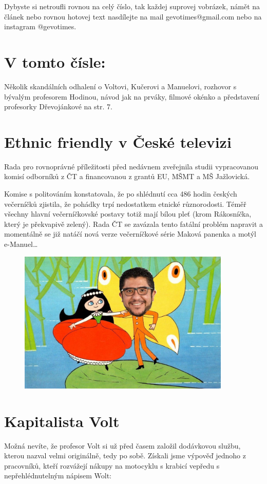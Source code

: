 \documentclass[twoside, 11pt]{article}
\begin{document}
 Dybyste si netroufli rovnou na celý číslo, tak každej suprovej vobrázek,
 námět na článek nebo rovnou hotovej text nasdílejte na mail \mbox{gevotimes@gmail.com} nebo na instagram \mbox{@gevotimes}.

\vspace{1.75\baselineskip}
\section*{V tomto čísle:}
Několik skandálních odhalení o Voltovi, Kučerovi a Manuelovi, rozhovor s bývalým profesorem Hodinou, návod jak na prváky, filmové okénko a představení profesorky Dřevojánkové na str. 7.

\clearpage
\section*{Ethnic friendly v České televizi}
Rada pro rovnoprávné příležitosti před nedávnem
zveřejnila studii vypracovanou komisí odborníků z
ČT a financovanou z grantů EU, MŠMT a MŠ
Jažlovická.


Komise s politováním konstatovala, že po shlédnutí
cca 486 hodin českých večerníčků zjistila, že
pohádky trpí nedostatkem etnické různorodosti.
Téměř všechny hlavní večerníčkovské postavy totiž
mají bílou pleť (krom Rákosníčka, který je
překvapivě zelený). Rada ČT se zavázala tento
fatální problém napravit a momentálně se již natáčí
nová verze večerníčkové série Maková panenka a
motýl e-Manuel\dots


\begin{figure}[htbp]
    \centering
    \includegraphics[width=0.9\textwidth]{emanuel}
\end{figure}

\chead{}
\clearpage
\section*{Kapitalista Volt}
Možná nevíte, že profesor Volt si už před časem založil dodávkovou službu, kterou nazval velmi
originálně, tedy po sobě. Získali jsme výpověď jednoho z pracovníků, kteří rozvážejí nákupy na
motocyklu s krabicí vepředu s nepřehlédnutelným nápisem Wolt:
\end{document}
